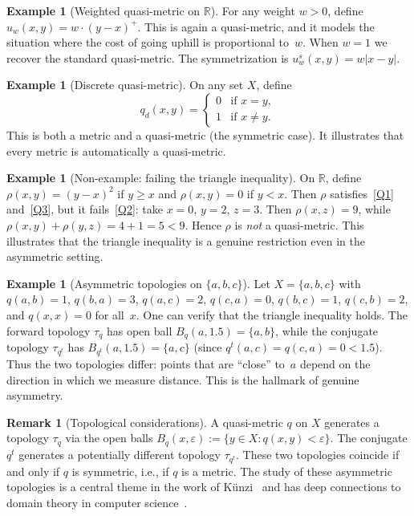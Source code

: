 \documentclass[11pt,a4paper]{article}
\theoremstyle{plain}
\theoremstyle{definition}
\newtheorem{exampleinner}[theoreminner]{Example}
\newtheorem{remarkinner}[theoreminner]{Remark}
\newenvironment{example}[1][]{\begin{exampleinner}[#1]}{\end{exampleinner}}
\newenvironment{remark}[1][]{\begin{remarkinner}[#1]}{\end{remarkinner}}
\newcommand{\R}{\mathbb{R}}
\newcommand{\eps}{\varepsilon}
\begin{document}
\begin{example}[Weighted quasi-metric on $\R$]\label{ex:weighted-qm}
For any weight $w>0$, define $u_w(x,y)=w\cdot(y-x)^+$.  This is
again a quasi-metric, and it models the situation where the cost of
going uphill is proportional to~$w$.  When $w=1$ we recover the
standard quasi-metric.  The symmetrization is $u_w^s(x,y)=w|x-y|$.
\end{example}

\begin{example}[Discrete quasi-metric]\label{ex:discrete-qm}
On any set $X$, define
\[
  q_d(x,y)=\begin{cases} 0 & \text{if } x=y,\\ 1 & \text{if } x\neq y.\end{cases}
\]
This is both a metric and a quasi-metric (the symmetric case).  It
illustrates that every metric is automatically a quasi-metric.
\end{example}

\begin{example}[Non-example: failing the triangle inequality]\label{ex:non-qm}
On $\R$, define $\rho(x,y)=(y-x)^2$ if $y\ge x$ and $\rho(x,y)=0$
if $y<x$.  Then $\rho$ satisfies~\ref{Q1} and~\ref{Q3}, but it
fails~\ref{Q2}: take $x=0$, $y=2$, $z=3$.  Then $\rho(x,z)=9$,
while $\rho(x,y)+\rho(y,z)=4+1=5<9$.  Hence $\rho$ is \emph{not}
a quasi-metric.  This illustrates that the triangle inequality is a
genuine restriction even in the asymmetric setting.
\end{example}

\begin{example}[Asymmetric topologies on $\{a,b,c\}$]\label{ex:asym-topologies}
Let $X=\{a,b,c\}$ with $q(a,b)=1$, $q(b,a)=3$, $q(a,c)=2$,
$q(c,a)=0$, $q(b,c)=1$, $q(c,b)=2$, and $q(x,x)=0$ for all~$x$.
One can verify that the triangle inequality holds.  The forward
topology $\tau_q$ has open ball $B_q(a,1.5)=\{a,b\}$, while the
conjugate topology $\tau_{q^t}$ has $B_{q^t}(a,1.5)=\{a,c\}$
(since $q^t(a,c)=q(c,a)=0<1.5$).  Thus the two topologies differ:
points that are ``close'' to~$a$ depend on the direction in which we
measure distance.  This is the hallmark of genuine asymmetry.
\end{example}

\begin{remark}[Topological considerations]\label{rem:topology}
A quasi-metric $q$ on $X$ generates a topology $\tau_q$ via the
open balls $B_q(x,\eps):=\{y\in X:q(x,y)<\eps\}$.  The conjugate
$q^t$ generates a potentially different topology $\tau_{q^t}$.
These two topologies coincide if and only if $q$ is symmetric, i.e.,
if $q$ is a metric.  The study of these asymmetric topologies is a
central theme in the work of K\"unzi~\cite{kunzi1995,kunzi2001} and
has deep connections to domain theory in computer
science~\cite{abramsky1994,scott1982}.
\end{remark}
\end{document}
